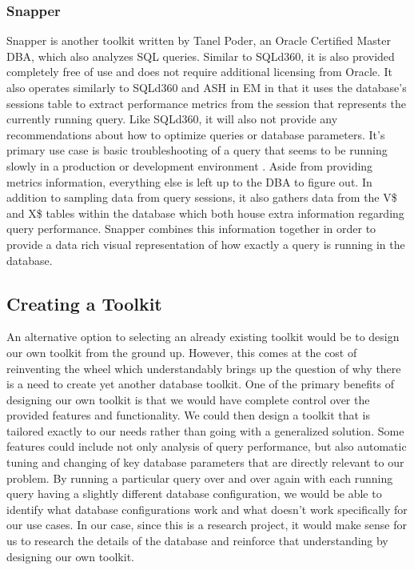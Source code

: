 \documentclass[draftclsnofoot, onecolumn, compsoc, 10pt]{IEEEtran}
\begin{document}
\subsubsection{Snapper}
Snapper is another toolkit written by Tanel Poder, an Oracle Certified Master DBA, which also analyzes SQL queries. 
Similar to SQLd360, it is also provided completely free of use and does not require additional licensing from Oracle. 
It also operates similarly to SQLd360 and ASH in EM in that it uses the database's sessions table to extract performance metrics from the session that represents the currently running query. 
Like SQLd360, it will also not provide any recommendations about how to optimize queries or database parameters.
It's primary use case is basic troubleshooting of a query that seems to be running slowly in a production or development environment \cite{tech.E2SN}. 
Aside from providing metrics information, everything else is left up to the DBA to figure out.
In addition to sampling data from query sessions, it also gathers data from the V\$ and X\$ tables within the database which both house extra information regarding query performance. 
Snapper combines this information together in order to provide a data rich visual representation of how exactly a query is running in the database. 

\subsection{Creating a Toolkit}
An alternative option to selecting an already existing toolkit would be to design our own toolkit from the ground up. 
However, this comes at the cost of reinventing the wheel which understandably brings up the question of why there is a need to create yet another database toolkit.
One of the primary benefits of designing our own toolkit is that we would have complete control over the provided features and functionality.
We could then design a toolkit that is tailored exactly to our needs rather than going with a generalized solution.
Some features could include not only analysis of query performance, but also automatic tuning and changing of key database parameters that are directly relevant to our problem.
By running a particular query over and over again with each running query having a slightly different database configuration, we would be able to identify what database configurations work and what doesn't work specifically for our use cases.
In our case, since this is a research project, it would make sense for us to research the details of the database and reinforce that understanding by designing our own toolkit.
\end{document}
